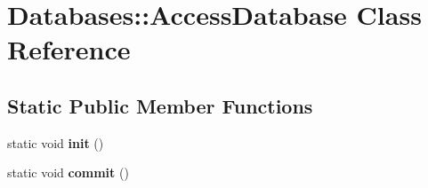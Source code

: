 \hypertarget{classDatabases_1_1AccessDatabase}{}\section{Databases\+:\+:Access\+Database Class Reference}
\label{classDatabases_1_1AccessDatabase}
\subsection*{Static Public Member Functions}
\begin{DoxyCompactItemize}
\item 
\hypertarget{classDatabases_1_1AccessDatabase_a5a3df6b81283bbb9f25bf7a531f470ff}{}static void {\bfseries init} ()\label{classDatabases_1_1AccessDatabase_a5a3df6b81283bbb9f25bf7a531f470ff}

\item 
\hypertarget{classDatabases_1_1AccessDatabase_ac1a811b4c3d017665c95cc23740d90f9}{}static void {\bfseries commit} ()\label{classDatabases_1_1AccessDatabase_ac1a811b4c3d017665c95cc23740d90f9}

\end{DoxyCompactItemize}
